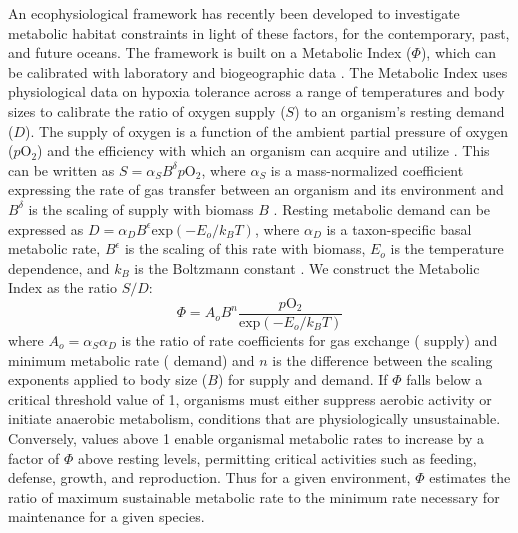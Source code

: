\documentclass{report_chapter}
\begin{document}
An ecophysiological framework has recently been developed to investigate metabolic habitat constraints in light of these factors, for the contemporary, past, and future oceans.
The framework is built on a Metabolic Index ($\Phi$), which can be calibrated with laboratory and biogeographic data \citep{Deutsch-Ferrel-etal-2015}.
The Metabolic Index uses physiological data on hypoxia tolerance across a range of temperatures and body sizes to calibrate the ratio of oxygen supply ($S$) to an organism's resting demand ($D$).
The supply of oxygen is a function of the ambient partial pressure of oxygen ($p\mathrm{O}_2$) and the efficiency with which an organism can acquire and utilize \OO{}.
This can be written as $S = \alpha_S B^{\delta}p\mathrm{O}_2$, where $\alpha_S$ is a mass-normalized coefficient expressing the rate of gas transfer between an organism and its environment and $B^{\delta}$ is the scaling of supply with biomass $B$ \citep{Piiper-Dejours-etal-1971}.
Resting metabolic demand can be expressed as $D = \alpha_D B^{\epsilon}\mathrm{exp}(-E_o/k_B T)$, where $\alpha_D$ is a taxon-specific basal metabolic rate, $B^\epsilon$ is the scaling of this rate with biomass, $E_o$ is the temperature dependence, and $k_B$ is the Boltzmann constant \citep{Gillooly-Brown-etal-2001}.
We construct the Metabolic Index as the ratio $S/D$:
\begin{equation}
\Phi = A_o B^n  \frac{p\mathrm{O}_2}{\mathrm{exp}(-E_o/k_B T)}
\label{eqn:MI}
\end{equation}
where $A_o=\alpha_S\alpha_D$ is the ratio of rate coefficients for gas exchange (\OO{} supply) and minimum metabolic rate (\OO{} demand) and $n$ is the difference between the scaling exponents applied to body size ($B$) for \OO{} supply and demand.
If $\Phi$ falls below a critical threshold value of 1, organisms must either suppress aerobic activity or initiate anaerobic metabolism, conditions that are physiologically unsustainable.
Conversely, values above 1 enable organismal metabolic rates to increase by a factor of $\Phi$ above resting levels, permitting critical activities such as feeding, defense, growth, and reproduction.
Thus for a given environment, $\Phi$ estimates the ratio of maximum sustainable metabolic rate to the minimum rate necessary for maintenance for a given species.
\end{document}
